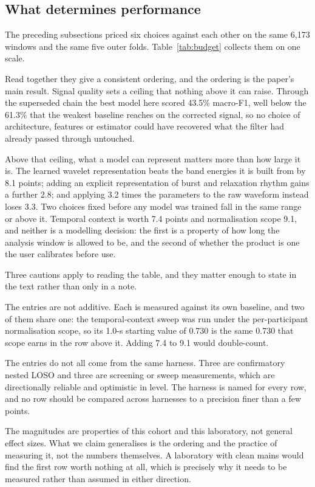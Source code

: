 \documentclass[pdflatex,sn-nature,iicol]{sn-jnl}
\begin{document}
\subsection{What determines performance}
\label{sec:budget}

The preceding subsections priced six choices against each other on the same 6,173 windows and the same five outer folds. Table~\ref{tab:budget} collects them on one scale.

Read together they give a consistent ordering, and the ordering is the paper's main result. Signal quality sets a ceiling that nothing above it can raise. Through the superseded chain the best model here scored 43.5\% macro-F1, well below the 61.3\% that the weakest baseline reaches on the corrected signal, so no choice of architecture, features or estimator could have recovered what the filter had already passed through untouched.

Above that ceiling, what a model can represent matters more than how large it is. The learned wavelet representation beats the band energies it is built from by 8.1 points; adding an explicit representation of burst and relaxation rhythm gains a further 2.8; and applying 3.2 times the parameters to the raw waveform instead loses 3.3. Two choices fixed before any model was trained fall in the same range or above it. Temporal context is worth 7.4 points and normalisation scope 9.1, and neither is a modelling decision: the first is a property of how long the analysis window is allowed to be, and the second of whether the product is one the user calibrates before use.

Three cautions apply to reading the table, and they matter enough to state in the text rather than only in a note.

The entries are not additive. Each is measured against its own baseline, and two of them share one: the temporal-context sweep was run under the per-participant normalisation scope, so its 1.0-s starting value of 0.730 is the same 0.730 that scope earns in the row above it. Adding 7.4 to 9.1 would double-count.

The entries do not all come from the same harness. Three are confirmatory nested LOSO and three are screening or sweep measurements, which are directionally reliable and optimistic in level. The harness is named for every row, and no row should be compared across harnesses to a precision finer than a few points.

The magnitudes are properties of this cohort and this laboratory, not general effect sizes. What we claim generalises is the ordering and the practice of measuring it, not the numbers themselves. A laboratory with clean mains would find the first row worth nothing at all, which is precisely why it needs to be measured rather than assumed in either direction.
\end{document}
